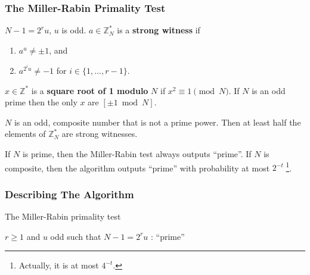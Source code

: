\begin{frame}\frametitle{The Miller-Rabin Primality Test}
$N-1=2^ru$, $u$ is odd. $a \in \mathbb{Z}^*_N$ is a \textbf{strong witness} if
\begin{enumerate}
\item $a^u \neq \pm 1$, and
\item $a^{2^iu} \neq -1$ for $i\in\{1,\dotsc,r-1\}$.
\end{enumerate}
\begin{lemma}
$x \in \mathbb{Z}^*$ is a \textbf{square root of 1 modulo} $N$ if $x^2 \equiv 1 \pmod N$. If $N$ is an odd prime then the only $x$ are $[\pm 1 \bmod N]$.
\end{lemma}
\begin{theorem}
$N$ is an odd, composite number that is not a prime power. Then at least half the elements of $\mathbb{Z}^*_N$ are strong witnesses.
\end{theorem}
\begin{theorem}
If $N$ is prime, then the Miller-Rabin test always outputs ``prime''. If $N$ is composite, then the algorithm outputs ``prime'' with probability at most $2^{-t}\;$\footnote{Actually, it is at most $4^{-t}$.}.
\end{theorem}
\end{frame}
\begin{frame}\frametitle{Describing The Algorithm}
\begin{algorithm}[H]
\DontPrintSemicolon
\caption{The Miller-Rabin primality test}
\BlankLine

\KwC $r\ge 1$ and $u$ odd such that $N-1 = 2^ru$\;
\KwL: 
\Return ``prime''
\end{algorithm}
\end{frame}
